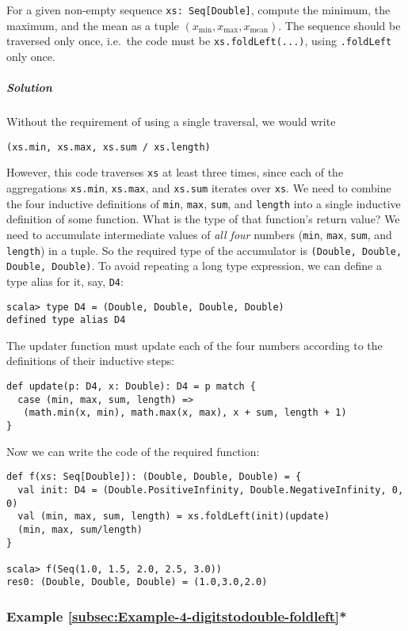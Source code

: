 For a given non-empty sequence \lstinline!xs: Seq[Double]!, compute
the minimum, the maximum, and the mean as a tuple $\left(x_{\min},x_{\max},x_{\text{mean}}\right)$.
The sequence should be traversed only once, i.e.~the code must be
\lstinline!xs.foldLeft(...)!, using \lstinline!.foldLeft! only once.

\subparagraph{Solution}

Without the requirement of using a single traversal, we would write
\begin{lstlisting}
(xs.min, xs.max, xs.sum / xs.length)
\end{lstlisting}
However, this code traverses \lstinline!xs! at least three times,
since each of the aggregations \lstinline!xs.min!, \lstinline!xs.max!,
and \lstinline!xs.sum! iterates over \lstinline!xs!. We need to
combine the four inductive definitions of \lstinline!min!, \lstinline!max!,
\lstinline!sum!, and \lstinline!length! into a single inductive
definition of some function. What is the type of that function's return
value? We need to accumulate intermediate values of \emph{all four}
numbers (\lstinline!min!, \lstinline!max!, \lstinline!sum!, and
\lstinline!length!) in a tuple. So the required type of the accumulator
is \lstinline!(Double, Double, Double, Double)!. To avoid repeating
a long type expression, we can define a type alias
for it, say, \lstinline!D4!:
\begin{lstlisting}
scala> type D4 = (Double, Double, Double, Double)
defined type alias D4 
\end{lstlisting}
The updater function must update each of the four numbers according
to the definitions of their inductive steps:
\begin{lstlisting}
def update(p: D4, x: Double): D4 = p match {
  case (min, max, sum, length) =>
   (math.min(x, min), math.max(x, max), x + sum, length + 1)
}
\end{lstlisting}
Now we can write the code of the required function:
\begin{lstlisting}
def f(xs: Seq[Double]): (Double, Double, Double) = {
  val init: D4 = (Double.PositiveInfinity, Double.NegativeInfinity, 0, 0)
  val (min, max, sum, length) = xs.foldLeft(init)(update)
  (min, max, sum/length)
}

scala> f(Seq(1.0, 1.5, 2.0, 2.5, 3.0))
res0: (Double, Double, Double) = (1.0,3.0,2.0)
\end{lstlisting}


\subsubsection{Example \label{subsec:Example-4-digitstodouble-foldleft}\ref{subsec:Example-4-digitstodouble-foldleft}{*}}

